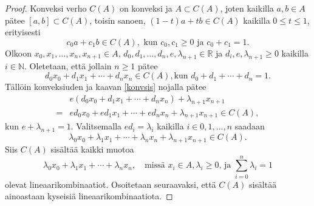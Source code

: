 \documentclass[12pt,a4paper,leqno]{report}
\newcommand{\R}{\mathbb{R}}
\newcommand{\N}{\mathbb{N}}
\theoremstyle{plain}
\theoremstyle{definition}
\theoremstyle{remark}
\begin{document}
\begin{proof}
Konveksi verho $C(A)$ on konveksi ja $A\subset C(A)$, 
joten kaikilla $a,b\in A$ pätee $[a,b]\subset C(A)$, 
toisin sanoen, $(1-t)a+tb\in C(A)$ kaikilla $0\leq t \leq 1$, 
erityisesti 
\begin{equation}\label{konvsis}
c_0 a+c_1 b \in C(A),\text{ kun }c_0,c_1\geq 0\text{ ja }c_0 +c_1=1.
\end{equation}
Olkoon $x_0,x_1,\dots, x_n, x_{n+1} \in A$, 
$d_0,d_1,\dots, d_n,e, \lambda_{n+1} \in \R$ 
ja $d_i,e, \lambda_{n+1}\geq 0$ kaikilla $ i\in\N$. 
Oletetaan, että jollain $n\geq 1$ pätee 
\begin{equation*}
d_0 x_0+d_1 x_1+\cdots+d_{n} x_{n}\in C(A), \text{kun } d_0+d_1+\cdots+ d_{n} =1.
 \end{equation*}
Tällöin konveksiuden ja kaavan \ref{konvsis} nojalla pätee 
\begin{equation*}
\begin{split}
&e(d_0 x_0+d_1 x_1+\cdots+d_{n}x_n)+\lambda_{n+1} x_{n+1}\\
=&e d_0 x_0+e d_1 x_1+\cdots+e d_{n}x_n+\lambda_{n+1} x_{n+1}
\in C(A),
\end{split}
\end{equation*}
kun $e+\lambda_{n+1} =1$. Valitsemalla $ed_i= \lambda_{i}$ kaikilla $i\in {0,1,\dots,n}$ saadaan $$\lambda_0 x_0+\lambda_1 x_1+\cdots+\lambda_{n} x_{n}+ \lambda_{n+1} x_{n+1}
\in C(A).$$ Siis $C(A)$ sisältää kaikki muotoa 
\begin{equation*}
\lambda_0 x_0+\lambda_1 x_1+\cdots+\lambda_{n} x_{n},
\quad\text{missä } x_i\in A, \lambda_i\geq0\text{, ja }
\sum_{i=0}^{n}{\lambda_i}=1
\end{equation*} 
olevat lineaarikombinaatiot. 
Osoitetaan seuraavaksi, että $C(A)$ sisältää ainoastaan kyseisiä lineaarikombinaatiota.

\end{proof}
\end{document}
